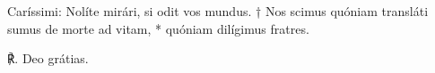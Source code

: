 \begin{flushright}{\fontsize{9}{11}}\end{flushright}
Caríssimi: Nolíte mirári, si odit vos mundus. † Nos scimus quóniam transláti sumus de morte ad vitam, * quóniam dilígimus fratres.

℟. Deo grátias.
